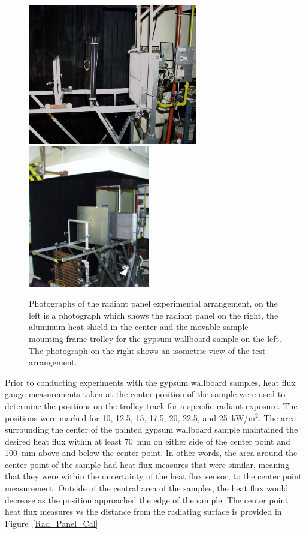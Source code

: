 \documentclass[twoside]{uocthesis}
\begin{document}
{\begin{figure}
	\centering
	\includegraphics[width=2.92in]{../Figures/RAD_pan}
	\includegraphics[width=2.08in]{../Figures/RAD_pan_iso} \\
	\caption[Photographs of the radiant panel experimental arrangement]{Photographs of the radiant panel experimental arrangement, on the left is a photograph which shows the radiant panel on the right, the aluminum heat shield in the center and the movable sample mounting frame trolley for the gypsum wallboard sample on the left.  The photograph on the right shows an isometric view of the test arrangement.}
	\label{Rad_Panel}
\end{figure}

Prior to conducting experiments with the gypsum wallboard samples, heat flux gauge measurements taken at the center position of the sample were used to determine the positions on the trolley track for a specific radiant exposure. The positions were marked for 10, 12.5, 15, 17.5, 20, 22.5, and 25~kW/m$^2$. The area surrounding the center of the painted gypsum wallboard sample maintained the desired heat flux within at least 70~mm on either side of the center point and 100~mm above and below the center point.  In other words, the area around the center point of the sample had heat flux measures that were similar, meaning that they were within the uncertainty of the heat flux sensor, to the center point measurement. Outside of the central area of the samples, the heat flux would decrease as the position approached the edge of the sample.  The center point heat flux measures vs the distance from the radiating surface is provided in Figure~\ref{Rad_Panel_Cal}   

}
\end{document}
